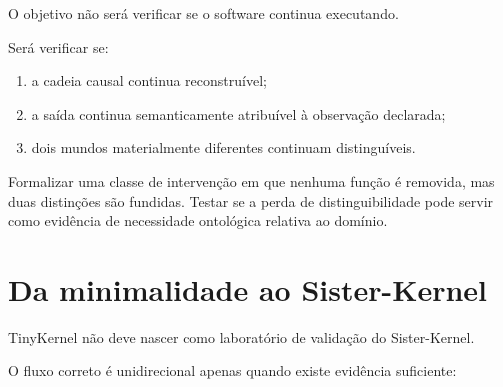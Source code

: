\documentclass[11pt,a4paper]{article}
\begin{document}
O objetivo não será verificar se o software continua executando.

Será verificar se:

\begin{enumerate}
  \item a cadeia causal continua reconstruível;
  \item a saída continua semanticamente atribuível à observação declarada;
  \item dois mundos materialmente diferentes continuam distinguíveis.
\end{enumerate}

\begin{markerbox}
Formalizar uma classe de intervenção em que nenhuma função é removida, mas duas
distinções são fundidas. Testar se a perda de distinguibilidade pode servir como
evidência de necessidade ontológica relativa ao domínio.
\end{markerbox}

\section{Da minimalidade ao Sister-Kernel}

TinyKernel não deve nascer como laboratório de validação do Sister-Kernel.

O fluxo correto é unidirecional apenas quando existe evidência suficiente:

\begin{center}
\end{center}
\end{document}

